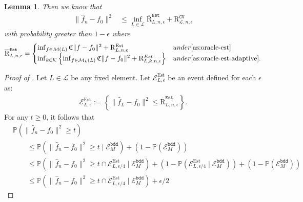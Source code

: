 \documentclass[12pt]{article}
\newtheorem{lemma}[theorem]{Lemma}
\begin{document}
\begin{appendices}
\begin{lemma}
Then we know that
            \begin{equation*}
            \begin{aligned}
        \|\widehat{f}_n-f_0\|^2 &\le   \inf_{L \in \mathcal{L}}\overline{\mathrm{R}}_{L,n,\epsilon}^{\mathtt{Est}}  + \mathrm{R}_{\mathcal{L}, n,\epsilon}^{\mathtt{CV}}
            \end{aligned}
    \end{equation*}
    with probability greater than $1-\epsilon$ where 
    \begin{equation*}
        \overline{\mathrm{R}}_{L,n,\epsilon}^{\mathtt{Est}} = 
        \begin{cases}
        \inf_{f\in \mathcal{M}(L)}\mathfrak{C}\|f - f_0\|^2 + \mathrm{R}_{L,n,\epsilon}^{\mathrm{Est}} & \textrm{under \Cref{as:oracle-est} } \\
       \inf_{k \in\mathcal{K} }\left\{\inf_{f\in \mathcal{M}_k(L)}\mathfrak{C}\| f-f_0\|^2 + \mathrm{R}_{L,k,n,\epsilon}^{\rm Est}\right\} & \textrm{under \Cref{as:oracle-est-adaptive}.}
        \end{cases}
    \end{equation*}
\end{lemma}
\begin{proof}[Proof of ]
Let $L\in\mathcal{L}$ be any fixed element. Let $\mathcal{E}_{L,\epsilon}^{\mathrm{Est}}$ be an event defined for each $\epsilon$ as:
    \begin{align*}
        \mathcal{E}_{L,\epsilon}^{\mathrm{Est}} := \left\{\|\widehat{f}_L-f_0\|^2 \leq \overline{\mathrm{R}}_{L,n,\epsilon}^{\mathtt{Est}}\right\}.
    \end{align*}
For any $t \ge 0$, it follows that 
\begin{equation*}
\begin{aligned}
    &\mathbb{P}(\|\widehat f_n - f_0\|^2 \ge t) \\
    &\qquad\le \mathbb{P}(\|\widehat f_n - f_0\|^2 \ge t \mid \mathcal{E}^{\mathtt{bdd}}_{M}) + (1-\mathbb{P}(\mathcal{E}^{\mathtt{bdd}}_{M})) \\
    &\qquad\le \mathbb{P}(\|\widehat f_n - f_0\|^2 \ge t \cap \mathcal{E}^{\mathrm{Est}}_{L,\epsilon/4} \mid  \mathcal{E}^{\mathtt{bdd}}_{M}) + (1-\mathbb{P}(\mathcal{E}^{\mathrm{Est}}_{L,\epsilon/4} \mid \mathcal{E}^{\mathtt{bdd}}_{M})) + (1-\mathbb{P}(\mathcal{E}^{\mathtt{bdd}}_{M})) \\
    &\qquad\le \mathbb{P}(\|\widehat f_n - f_0\|^2 \ge t \cap \mathcal{E}^{\mathrm{Est}}_{L,\epsilon/4} \mid  \mathcal{E}^{\mathtt{bdd}}_{M} ) + \epsilon/2

\end{aligned}
\end{equation*}
\end{proof}
\end{appendices}
\end{document}
